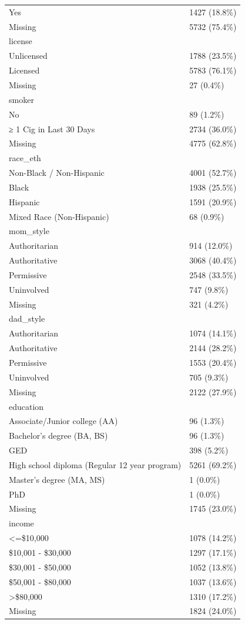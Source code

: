 \documentclass[
]{article}
\begin{document}
\begin{longtable}[]{@{}ll@{}}
Yes & 1427 (18.8\%) \\
Missing & 5732 (75.4\%) \\
license & \\
Unlicensed & 1788 (23.5\%) \\
Licensed & 5783 (76.1\%) \\
Missing & 27 (0.4\%) \\
smoker & \\
No & 89 (1.2\%) \\
≥ 1 Cig in Last 30 Days & 2734 (36.0\%) \\
Missing & 4775 (62.8\%) \\
race\_eth & \\
Non-Black / Non-Hispanic & 4001 (52.7\%) \\
Black & 1938 (25.5\%) \\
Hispanic & 1591 (20.9\%) \\
Mixed Race (Non-Hispanic) & 68 (0.9\%) \\
mom\_style & \\
Authoritarian & 914 (12.0\%) \\
Authoritative & 3068 (40.4\%) \\
Permissive & 2548 (33.5\%) \\
Uninvolved & 747 (9.8\%) \\
Missing & 321 (4.2\%) \\
dad\_style & \\
Authoritarian & 1074 (14.1\%) \\
Authoritative & 2144 (28.2\%) \\
Permissive & 1553 (20.4\%) \\
Uninvolved & 705 (9.3\%) \\
Missing & 2122 (27.9\%) \\
education & \\
Associate/Junior college (AA) & 96 (1.3\%) \\
Bachelor's degree (BA, BS) & 96 (1.3\%) \\
GED & 398 (5.2\%) \\
High school diploma (Regular 12 year program) & 5261 (69.2\%) \\
Master's degree (MA, MS) & 1 (0.0\%) \\
PhD & 1 (0.0\%) \\
Missing & 1745 (23.0\%) \\
income & \\
\textless=\$10,000 & 1078 (14.2\%) \\
\$10,001 - \$30,000 & 1297 (17.1\%) \\
\$30,001 - \$50,000 & 1052 (13.8\%) \\
\$50,001 - \$80,000 & 1037 (13.6\%) \\
\textgreater\$80,000 & 1310 (17.2\%) \\
Missing & 1824 (24.0\%) \\
\end{longtable}
\end{document}
